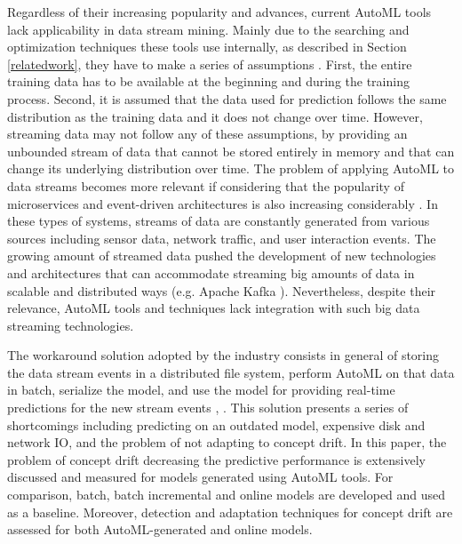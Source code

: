 \documentclass{sig-alternate-br}
\begin{document}
Regardless of their increasing popularity and advances, current AutoML tools lack applicability in data stream mining. Mainly due to the searching and optimization techniques these tools use internally, as described in Section \ref{relatedwork}, they have to make a series of assumptions \cite{madrid2019towards}. First, the entire training data has to be available at the beginning and during the training process. Second, it is assumed that the data used for prediction follows the same distribution as the training data and it does not change over time. However, streaming data may not follow any of these assumptions, by providing an unbounded stream of data that cannot be stored entirely in memory and that can change its underlying distribution over time. The problem of applying AutoML to data streams becomes more relevant if considering that the popularity of microservices and event-driven architectures is also increasing considerably \cite{richards2015microservices}. In these types of systems, streams of data are constantly generated from various sources including sensor data, network traffic, and user interaction events. The growing amount of streamed data pushed the development of new technologies and architectures that can accommodate streaming big amounts of data in scalable and distributed ways (e.g. Apache Kafka \cite{kreps2011kafka}). Nevertheless, despite their relevance, AutoML tools and techniques lack integration with such big data streaming technologies.

The workaround solution adopted by the industry consists in general of storing the data stream events in a distributed file system, perform AutoML on that data in batch, serialize the model, and use the model for providing real-time predictions for the new stream events \cite{uber2017michelangelo}, \cite{gctables}. This solution presents a series of shortcomings including predicting on an outdated model, expensive disk and network IO, and the problem of not adapting to concept drift. In this paper, the problem of concept drift decreasing the predictive performance is extensively discussed and measured for models generated using AutoML tools. For comparison, batch, batch incremental and online models are developed and used as a baseline. Moreover, detection and adaptation techniques for concept drift are assessed for both AutoML-generated and online models. 
\end{document}
